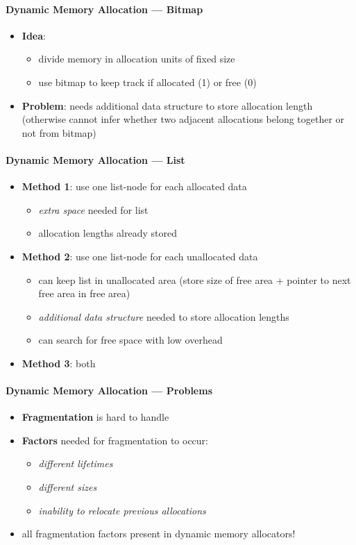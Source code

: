 \paragraph{Dynamic Memory Allocation --- Bitmap}
\begin{itemize}
  \item \textbf{Idea}:
  \begin{itemize}
    \item divide memory in allocation units of fixed size
    \item use bitmap to keep track if allocated (1) or free (0)
  \end{itemize}
  \item \textbf{Problem}: needs additional data structure to store allocation length (otherwise cannot infer whether two adjacent allocations belong together or not from bitmap)
\end{itemize}

\paragraph{Dynamic Memory Allocation --- List}
\begin{itemize}
  \item \textbf{Method 1}: use one list-node for each allocated data
  \begin{itemize}
    \item \emph{extra space} needed for list
    \item allocation lengths already stored
  \end{itemize}
  \item \textbf{Method 2}: use one list-node for each unallocated data
  \begin{itemize}
    \item can keep list in unallocated area (store size of free area + pointer to next free area in free area)
    \item \emph{additional data structure} needed to store allocation lengths
    \item can search for free space with low overhead
  \end{itemize}
  \item \textbf{Method 3}: both
\end{itemize}

\paragraph{Dynamic Memory Allocation --- Problems}
\begin{itemize}
  \item \textbf{Fragmentation} is hard to handle
  \item \textbf{Factors} needed for fragmentation to occur:
  \begin{itemize}
    \item \emph{different lifetimes}
    \item \emph{different sizes}
    \item \emph{inability to relocate previous allocations}
  \end{itemize}
  \item all fragmentation factors present in dynamic memory allocators!
\end{itemize}

